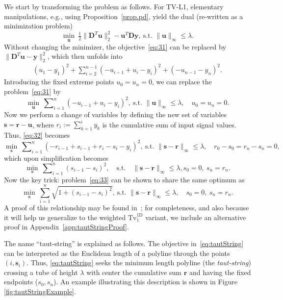 \documentclass[twoside,11pt]{article}
\newcommand{\vr}{\bm{r}}       \newcommand{\vrh}{\hat{\bm{r}}}        \newcommand{\rh}{\hat{r}}    \newcommand{\vrt}{\tilde{\bm{r}}}       \newcommand{\rt}{\tilde{r}}
\newcommand{\vs}{\bm{s}}       \newcommand{\vsh}{\hat{\bm{s}}}        \newcommand{\sh}{\hat{s}}    \newcommand{\vst}{\tilde{\bm{s}}}       \newcommand{\st}{\tilde{s}}
\newcommand{\vu}{\bm{u}}       \newcommand{\vuh}{\hat{\bm{u}}}        \newcommand{\uh}{\hat{u}}    \newcommand{\vut}{\tilde{\bm{u}}}       \newcommand{\ut}{\tilde{u}}
\newcommand{\vy}{\bm{y}}       \newcommand{\vyh}{\hat{\bm{y}}}        \newcommand{\yh}{\hat{y}}    \newcommand{\vyt}{\tilde{\bm{y}}}       \newcommand{\yt}{\tilde{y}}
\newcommand{\md}{\bm{D}}
\newcommand{\mynorm}[2]{\| {#1} \|_{#2}}
\newcommand{\infnorm}[1]{\mynorm{#1}{\infty}}
\newcommand{\enorm}[1]{\mynorm{#1}{2}}
\newcommand{\nlsum}{\sum\nolimits}
\newcommand{\half}{\tfrac{1}{2}}
\newcommand{\tvell}{\text{Tv}}
\newcommand{\oned}{\text{1D}}
\numberwithin{equation}{section}
\numberwithin{theorem}{section}
\begin{document}
We start by transforming the problem as follows. For TV-L1, elementary manipulations, e.g., using Proposition~\ref{prop.pd}, yield the dual (re-written as a minimization problem)
\begin{equation}
  \label{eq:31}
  \min_{\vu}\ \half\enorm{\md^T\vu}^2 - \vu^T\md\vy,\ \text{s.t. } \infnorm{\vu} \le \lambda.
\end{equation}
Without changing the minimizer, the objective~\eqref{eq:31} can be replaced by
$\enorm{\md^T\vu - \vy}^2$, which then unfolds into
\begin{align*}
   \left(u_1 - y_1 \right)^2 + \nlsum_{i=2}^{n-1} \left( -u_{i-1} + u_i - y_i \right)^2 + \left( -u_{n-1} - y_{n} \right)^2  .
\end{align*}
Introducing the fixed extreme points $u_0 = u_n = 0$, we can replace the problem~\eqref{eq:31} by
\begin{equation}
  \label{eq:32}
 \min_{\vu}\ \nlsum_{i=1}^n \left( - u_{i-1} + u_i - y_i \right)^2,\ \text{s.t. } \infnorm{\vu} \le \lambda,\quad u_0 = u_n = 0.
\end{equation}
Now we perform a change of variables by defining the new set of variables $\vs = \vr - \vu$, where $r_i := \sum_{k=1}^i y_k$ is the cumulative sum of input signal values. Thus, \eqref{eq:32}  becomes
\begin{equation*}
 \min_{\vs}\ \nlsum_{i=1}^n \left( - r_{i-1} + s_{i-1} + r_i - s_i - y_i \right)^2,\ \text{s.t. } \infnorm{\vs - \vr} \le \lambda,\quad r_0 - s_0 = r_n - s_n = 0 ,
\end{equation*}
which upon simplification becomes
\begin{equation}
  \label{eq:33}
 \min_{\vs}\ \nlsum_{i=1}^n \left( s_{i-1} - s_i \right)^2,\quad\text{s.t.}\quad \infnorm{\vs - \vr} \le \lambda, s_0 = 0,\  s_n = r_n .
\end{equation}
Now the key trick: problem~\eqref{eq:33} can be shown to share the same optimum as
\begin{equation}
 \label{eq:tautString}
 \min_{\vs}\ \sum_{i=1}^n \sqrt{1 + \left( s_{i-1} - s_i \right)^2},\ \text{s.t. } \infnorm{\vs - \vr} \le \lambda,\quad s_0 = 0,\  s_n = r_n.
\end{equation}
A proof of this relationship may be found in~\citep{SteidlTautString}; for completeness, and also because it will help us generalize to the weighted $\tvell_1^{\oned}$ variant, we include an alternative proof in Appendix~\ref{app:tautStringProof}.

The name ``taut-string'' is explained as follows. The objective in~\eqref{eq:tautString} can be interpreted as the Euclidean length of a polyline through the points $(i, \vs_i)$. Thus, \eqref{eq:tautString} seeks the minimum length polyline (the \emph{taut-string}) crossing a tube of height $\lambda$ with center the cumulative sum $\vr$ and having the fixed endpoints ($s_0, s_n$). An example illustrating this description is shown in Figure \ref{fig:tautStringExample}.
\end{document}
